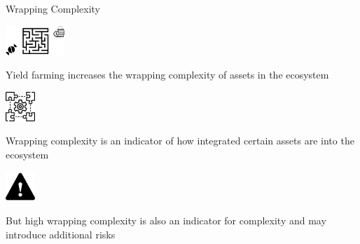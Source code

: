 \documentclass[handout]{beamer}
\begin{document}
\begin{frame}{Wrapping Complexity}
		\begin{minipage}{0.2\textwidth}
			\begin{center}
				\includegraphics[height=3em]{../assets/images/wrapping_complexity.png}
			\end{center}
		\end{minipage}
		\hspace{1 em}
		\begin{minipage}{0.72\textwidth}
		Yield farming increases the wrapping complexity of assets in the ecosystem
		\end{minipage}
		\pause
		\vspace{2 em}
		

		\begin{minipage}{0.2\textwidth}
			\begin{center}
				\includegraphics[height=3em]{../assets/images/solution.png}
			\end{center}
		\end{minipage}
		\hspace{1 em}
		\begin{minipage}{0.72\textwidth}
		Wrapping complexity is an indicator of how integrated certain assets are into the ecosystem
		\end{minipage}
		\pause
		\vspace{2 em}		
		
		
		\begin{minipage}{0.2\textwidth}
			\begin{center}
				\includegraphics[height=3em]{../assets/images/warning.png}
			\end{center}
		\end{minipage}
		\hspace{1 em}
		\begin{minipage}{0.72\textwidth}
		But high wrapping complexity is also an indicator for complexity and may introduce additional risks
		\end{minipage}
		\pause
\end{frame}
\end{document}
